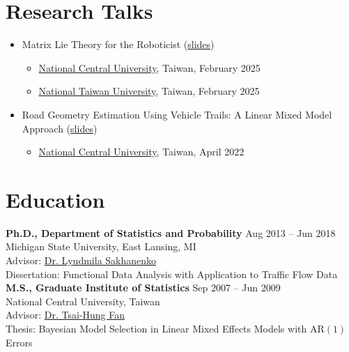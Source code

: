 \documentclass[a4paper,10pt,dvipdfmx]{article}
\begin{document}
\section*{Research Talks}
\begin{itemize}[noitemsep,nolistsep]
  \item Matrix Lie Theory for the Roboticist (\href{https://chris7462.github.io/Talks/MatrixLieRoboticist.pdf}{slides})
    \begin{itemize}[noitemsep,nolistsep]
      \item[] \href{https://w2.math.ncu.edu.tw/academic/speeches/1223}{National Central University}, Taiwan, February 2025
      \item[] \href{https://stat-ds.ntu.edu.tw/News_Content_n_75466_s_250488.html}{National Taiwan University}, Taiwan, February 2025
    \end{itemize}
  \item Road Geometry Estimation Using Vehicle Trails: A Linear Mixed Model Approach (\href{https://chris7462.github.io/Talks/RoadShapeEstimation.pdf}{slides})
    \begin{itemize}[noitemsep,nolistsep]
      \item[] \href{https://w2.math.ncu.edu.tw/academic/speeches/1158}{National Central University}, Taiwan, April 2022
    \end{itemize}
\end{itemize}

\section*{Education}
\indent \textbf{Ph.D., Department of Statistics and Probability} \hfill Aug 2013 -- Jun 2018\\
\indent Michigan State University, East Lansing, MI\\
\indent Advisor: \href{https://www.stt.msu.edu/users/luda/}{Dr. Lyudmila Sakhanenko}\\
\indent Dissertation: Functional Data Analysis with Application to Traffic Flow Data\\

\indent \textbf{M.S., Graduate Institute of Statistics} \hfill Sep 2007 -- Jun 2009\\
\indent National Central University, Taiwan\\
\indent Advisor: \href{http://www.stat.ncu.edu.tw/teacher/THFan/index.htm}{Dr. Tsai-Hung Fan}\\
\indent Thesis: Bayesian Model Selection in Linear Mixed Effects Models with AR$(1)$ Errors\\
\end{document}
